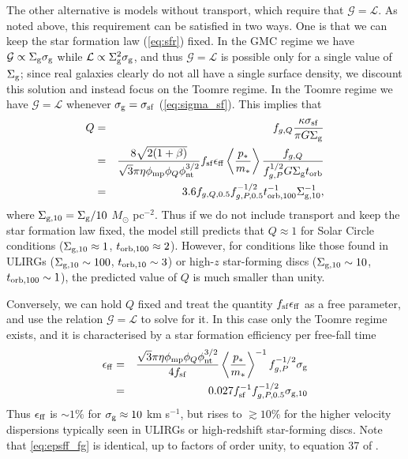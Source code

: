 \documentclass[useAMS,usenatbib]{mn2e}
\newcommand{\calL}{\mathcal{L}}
\newcommand{\calG}{\mathcal{G}}
\newcommand{\phint}{\phi_{\mathrm{nt}}}
\newcommand{\phimp}{\phi_{\mathrm{mp}}}
\begin{document}
The other alternative is models without transport, which require that $\calG = \calL$. As noted above, this requirement can be satisfied in two ways. One is that we can keep the star formation law (\autoref{eq:sfr}) fixed. In the GMC regime we have $\calG \propto \Sigma_{\rm g} \sigma_{\rm g}$ while $\calL \propto \Sigma_{\rm g}^2 \sigma_{\rm g}$, and thus $\calG = \calL$ is possible only for a single value of $\Sigma_{\rm g}$; since real galaxies clearly do not all have a single surface density, we discount this solution and instead focus on the Toomre regime. In the Toomre regime we have $\calG = \calL$ whenever $\sigma_{\rm g} = \sigma_{\rm sf}$ (\autoref{eq:sigma_sf}). This implies that
\begin{eqnarray}
Q & = & f_{g,Q} \frac{\kappa \sigma_{\rm sf}}{\pi G \Sigma_{\rm g}} 
\nonumber \\
\label{eq:Q_notransport}
& = & \frac{8\sqrt{2(1+\beta)}}{\sqrt{3}\pi \eta \phimp \phi_Q \phint^{3/2}} f_{\rm sf} \epsilon_{\rm ff} \left\langle\frac{p_*}{m_*}\right\rangle \frac{f_{g,Q}}{f_{g,P}^{1/2} G \Sigma_{\rm g} t_{\rm orb}} \\
& = & 3.6 f_{g,Q,0.5} f_{g,P,0.5}^{-1/2} t_{\rm orb,100}^{-1} \Sigma_{\rm g,10}^{-1},
\end{eqnarray}
where $\Sigma_{\rm g,10} = \Sigma_{\rm g}/10$ $M_\odot$ pc$^{-2}$. Thus if we do not include transport and keep the star formation law fixed, the model still predicts that $Q\approx 1$ for Solar Circle conditions ($\Sigma_{\rm g,10} \approx 1$, $t_{\rm orb,100} \approx 2$). However, for conditions like those found in ULIRGs ($\Sigma_{\rm g,10}\sim 100$, $t_{\rm orb,10} \sim 3$) or high-$z$ star-forming discs ($\Sigma_{\rm g,10} \sim 10$, $t_{\rm orb,100} \sim 1$), the predicted value of $Q$ is much smaller than unity.

Conversely, we can hold $Q$ fixed and treat the quantity $f_{\rm sf} \epsilon_{\rm ff}$ as a free parameter, and use the relation $\calG = \calL$ to solve for it. In this case only the Toomre regime exists, and it is characterised by a star formation efficiency per free-fall time
\begin{eqnarray}
\label{eq:epsff_fg}
\epsilon_{\rm ff} & = & \frac{\sqrt{3} \pi \eta \phimp \phi_Q \phint^{3/2}}{4 f_{\rm sf}} \left\langle\frac{p_*}{m_*}\right\rangle^{-1} f_{g,P}^{-1/2} \sigma_{\rm g} \\
& = & 0.027 f_{\rm sf}^{-1} f_{g,P,0.5}^{-1/2} \sigma_{\rm g,10}
\end{eqnarray}
Thus $\epsilon_{\rm ff}$ is $\sim 1\%$ for $\sigma_{\rm g} \approx 10$ km s$^{-1}$, but rises to $\gtrsim 10\%$ for the higher velocity dispersions typically seen in ULIRGs or high-redshift star-forming discs. Note that \autoref{eq:epsff_fg} is identical, up to factors of order unity, to equation 37 of \citet{faucher-giguere13a}.
\end{document}
